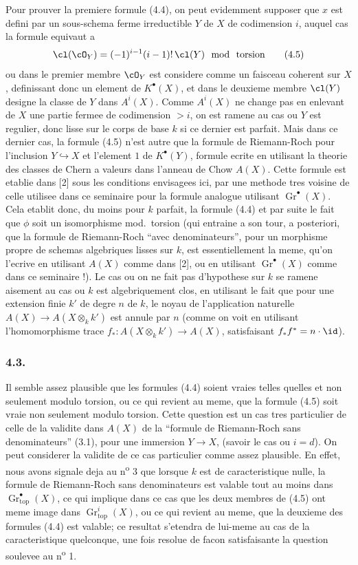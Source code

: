 Pour prouver la premiere formule (4.4), on peut evidemment supposer que $x$ est defini par un sous-schema ferme irreductible $Y$ de $X$ de codimension $i$, auquel cas la formule equivaut a
\[
\cl(\cO_Y) = (-1)^{i-1}(i-1)! \, \cl(Y) \mod \text{ torsion} \tag{4.5}
\]
ou dans le premier membre $\cO_Y$ est considere comme un faisceau coherent sur $X$, definissant donc un element de $K^{\bullet}(X)$, et dans le deuxieme membre $\cl(Y)$ designe la classe de $Y$ dans $A^{i}(X)$. Comme $A^{i}(X)$ ne change pas en enlevant de $X$ une partie fermee de codimension $> i$, on est ramene au cas ou $Y$ est regulier, donc lisse sur le corps de base $k$ si ce dernier est parfait. Mais dans ce dernier cas, la formule (4.5) n'est autre que la formule de Riemann-Roch pour l'inclusion $Y \hookrightarrow X$ et l'element $1$ de $K^{\bullet}(Y)$, formule ecrite en utilisant la theorie des classes de Chern a valeurs dans l'anneau de Chow $A(X)$. Cette formule est etablie dans [2] sous les conditions envisagees ici, par une methode tres voisine de celle utilisee dans ce seminaire pour la formule analogue utilisant $\operatorname{Gr}^{\bullet}(X)$. Cela etablit donc, du moins pour $k$ parfait, la formule (4.4) et par suite le fait que $\phi$ soit un isomorphisme mod.\ torsion (qui entraine a son tour, a posteriori, que la formule de Riemann-Roch ``avec denominateurs'', pour un morphisme propre de schemas algebriques lisses sur $k$, est essentiellement la meme, qu'on l'ecrive en utilisant $A(X)$ comme dans [2], ou en utilisant $\operatorname{Gr}^{\bullet}(X)$ comme dans ce seminaire !). Le cas ou on ne fait pas d'hypothese sur $k$ se ramene aisement au cas ou $k$ est algebriquement clos, en utilisant le fait que pour une extension finie $k'$ de degre $n$ de $k$, le noyau de l'application naturelle $A(X) \to A(X \otimes_k k')$ est annule par $n$ (comme on voit en utilisant l'homomorphisme trace $f_{*} : A(X \otimes_k k') \to A(X)$, satisfaisant $f_{*}f^{*} = n \cdot \id$).

\subsubsection*{4.3.}
Il semble assez plausible que les formules (4.4) soient vraies telles quelles et non seulement modulo torsion, ou ce qui revient au meme, que la formule (4.5) soit vraie non seulement modulo torsion. Cette question est un cas tres particulier de celle de la validite dans $A(X)$ de la ``formule de Riemann-Roch sans denominateurs'' (3.1), pour une immersion $Y \to X$, (savoir le cas ou $i = d$). On peut considerer la validite de ce cas particulier comme assez plausible. En effet, nous avons signale deja au n\textsuperscript{o} 3 que lorsque $k$ est de caracteristique nulle, la formule de Riemann-Roch sans denominateurs est valable tout au moins dans $\operatorname{Gr}_{\mathrm{top}}^{\bullet}(X)$, ce qui implique dans ce cas que les deux membres de (4.5) ont meme image dans $\operatorname{Gr}_{\mathrm{top}}^{i}(X)$, ou ce qui revient au meme, que la deuxieme des formules (4.4) est valable; ce resultat s'etendra de lui-meme au cas de la caracteristique quelconque, une fois resolue de facon satisfaisante la question soulevee au n\textsuperscript{o} 1.

